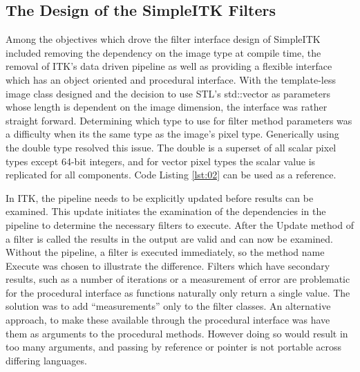 \documentclass{frontiersMED} %
\begin{document}
\subsection{The Design of the SimpleITK Filters}
Among the objectives which drove the filter interface design of
SimpleITK included removing the dependency on the image type at
compile time, the removal of ITK’s data driven pipeline as well as
providing a flexible interface which has an object oriented and
procedural interface. With the template-less image class designed and
the decision to use STL’s std::vector as parameters whose length is
dependent on the image dimension, the interface was rather straight
forward. Determining which type to use for filter method parameters
was a difficulty when its the same type as the image’s pixel
type. Generically using the double type resolved this issue. The
double is a superset of all scalar pixel types except 64-bit integers,
and for vector pixel types the scalar value is replicated for all
components. Code Listing \ref{lst:02} can be used as a reference.



In ITK, the pipeline needs to be explicitly updated before results can
be examined. This update initiates the examination of the dependencies
in the pipeline to determine the necessary filters to execute. After
the Update method of a filter is called the results in the output are
valid and can now be examined. Without the pipeline, a filter is
executed immediately, so the method name Execute was chosen to
illustrate the difference. Filters which have secondary results, such
as a number of iterations or a measurement of error are problematic
for the procedural interface as functions naturally only return a
single value. The solution was to add “measurements” only to the
filter classes. An alternative approach, to make these available
through the procedural interface was  have them as arguments to the
procedural methods. However doing so would result in too many
arguments, and passing by reference or pointer is not portable across
differing languages.
\end{document}
